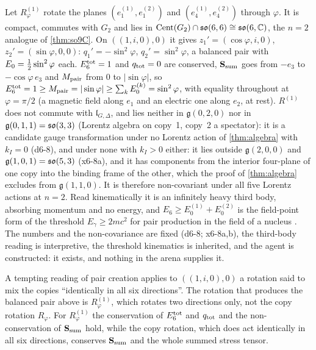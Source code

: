 \begin{example}
\label{d6:ex:R1}
Let $R^{(1)}_\varphi$ rotate the planes $(e^{(1)}_1,e^{(2)}_1)$ and $(e^{(1)}_4,e^{(2)}_4)$ through $\varphi$. It is compact, commutes with $G_2$ and lies in
$\operatorname{Cent}(G_2)\cap\mathfrak{so}(6,6)\cong\mathfrak{so}(6,\mathbb{C})$, the $n=2$ analogue of \cref{thm:so9C}. On $((1,i,0),0)$ it gives $z_1'=(\cos\varphi,i,0)$,
$z_2'=(\sin\varphi,0,0)$: $q_1'=-\sin^2\varphi$, $q_2'=\sin^2\varphi$, a balanced pair with $E_0=\tfrac12\sin^2\varphi$ each. $E_6^{\rm tot}=1$ and $q_{\rm tot}=0$
are conserved, $\mathbf S_{\rm sum}$ goes from $-e_3$ to $-\cos\varphi\,e_3$ and $M_{\rm pair}$ from $0$ to $|\sin\varphi|$, so
$E_6^{\rm tot}=1\ge M_{\rm pair}=|\sin\varphi|\ge\sum_kE_0^{(k)}=\sin^2\varphi$, with equality throughout at $\varphi=\pi/2$ (a magnetic field along $e_1$ and
an electric one along $e_2$, at rest). $R^{(1)}$ does not commute with $\mathfrak l_{G,\Delta}$, and lies neither in $\mathfrak g(0,2,0)$ nor in
$\mathfrak g(0,1,1)=\mathfrak{so}(3,3)$ (Lorentz algebra on copy~1, copy~2 a spectator): it is a candidate gauge transformation under no Lorentz action of
\cref{thm:algebra} with $k_I=0$ (d6-8), and under none with $k_I>0$ either: it lies outside $\mathfrak g(2,0,0)$ and
$\mathfrak g(1,0,1)=\mathfrak{so}(5,3)$ (x6-8a), and it has components from the interior four-plane of one copy into the binding frame of the other,
which the proof of \cref{thm:algebra} excludes from $\mathfrak g(1,1,0)$. It is therefore non-covariant under all five Lorentz actions at $n=2$. Read kinematically it is an infinitely heavy third body, absorbing momentum and no energy, and
$E_6\ge E_0^{(1)}+E_0^{(2)}$ is the field-point form of the threshold $E_\gamma\ge2mc^2$ for pair production in the field of a nucleus
\cite{BetheHeitler34}. The numbers and the non-covariance are fixed (d6-8; x6-8a,b), the third-body reading is interpretive, the threshold
kinematics is inherited, and the agent is constructed: it exists, and nothing in the arena supplies it.
\end{example}

A tempting reading of pair creation applies to $((1,i,0),0)$ a rotation said to mix the copies ``identically in all six directions''. The rotation
that produces the balanced pair above is $R^{(1)}_\varphi$, which rotates two directions only, not the copy rotation $R_\varphi$. For $R^{(1)}_\varphi$ the
conservation of $E_6^{\rm tot}$ and $q_{\rm tot}$ and the non-conservation of $\mathbf S_{\rm sum}$ hold, while the copy rotation, which does act identically
in all six directions, conserves $\mathbf S_{\rm sum}$ and the whole summed stress tensor.

